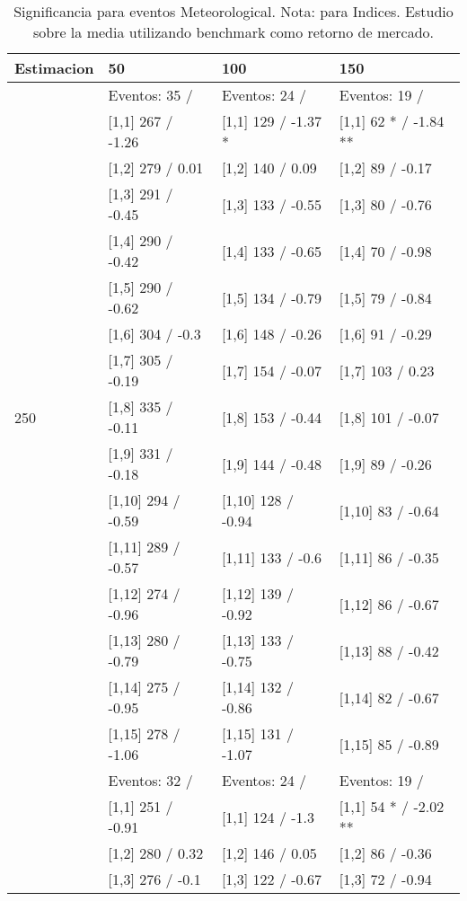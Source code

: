 \begin{table}

\caption{Significancia para eventos Meteorological. Nota: para Indices. Estudio sobre la media utilizando benchmark como retorno de mercado.}
\centering
\begin{tabular}[t]{llll}
\toprule
Estimacion & 50 & 100 & 150\\
\midrule
 & Eventos:  35 / & Eventos:  24 / & Eventos:  19 /\\
 & {}[1,1] 267  / -1.26 & {}[1,1] 129  / -1.37 * & {}[1,1] 62 * / -1.84 **\\
 & {}[1,2] 279  / 0.01 & {}[1,2] 140  / 0.09 & {}[1,2] 89  / -0.17\\
 & {}[1,3] 291  / -0.45 & {}[1,3] 133  / -0.55 & {}[1,3] 80  / -0.76\\
 & {}[1,4] 290  / -0.42 & {}[1,4] 133  / -0.65 & {}[1,4] 70  / -0.98\\
\addlinespace
 & {}[1,5] 290  / -0.62 & {}[1,5] 134  / -0.79 & {}[1,5] 79  / -0.84\\
 & {}[1,6] 304  / -0.3 & {}[1,6] 148  / -0.26 & {}[1,6] 91  / -0.29\\
 & {}[1,7] 305  / -0.19 & {}[1,7] 154  / -0.07 & {}[1,7] 103  / 0.23\\
250 & {}[1,8] 335  / -0.11 & {}[1,8] 153  / -0.44 & {}[1,8] 101  / -0.07\\
 & {}[1,9] 331  / -0.18 & {}[1,9] 144  / -0.48 & {}[1,9] 89  / -0.26\\
\addlinespace
 & {}[1,10] 294  / -0.59 & {}[1,10] 128  / -0.94 & {}[1,10] 83  / -0.64\\
 & {}[1,11] 289  / -0.57 & {}[1,11] 133  / -0.6 & {}[1,11] 86  / -0.35\\
 & {}[1,12] 274  / -0.96 & {}[1,12] 139  / -0.92 & {}[1,12] 86  / -0.67\\
 & {}[1,13] 280  / -0.79 & {}[1,13] 133  / -0.75 & {}[1,13] 88  / -0.42\\
 & {}[1,14] 275  / -0.95 & {}[1,14] 132  / -0.86 & {}[1,14] 82  / -0.67\\
\addlinespace
 & {}[1,15] 278  / -1.06 & {}[1,15] 131  / -1.07 & {}[1,15] 85  / -0.89\\
 & Eventos:  32 / & Eventos:  24 / & Eventos:  19 /\\
 & {}[1,1] 251  / -0.91 & {}[1,1] 124  / -1.3 & {}[1,1] 54 * / -2.02 **\\
 & {}[1,2] 280  / 0.32 & {}[1,2] 146  / 0.05 & {}[1,2] 86  / -0.36\\
 & {}[1,3] 276  / -0.1 & {}[1,3] 122  / -0.67 & {}[1,3] 72  / -0.94\\

\end{tabular}
\end{table}
